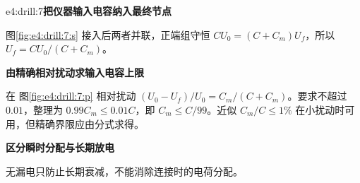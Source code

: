 \begin{drillsolution}{e4:drill:7}\textbf{把仪器输入电容纳入最终节点}\par\nobreak
图\ref{fig:e4:drill:7:s} 接入后两者并联，正端组守恒 $CU_0=(C+C_m)U_f$，所以 $U_f=CU_0/(C+C_m)$。



\par\medskip{}\noindent\textbf{由精确相对扰动求输入电容上限}\par\nobreak
在 图\ref{fig:e4:drill:7:p} 相对扰动 $(U_0-U_f)/U_0=C_m/(C+C_m)$。要求不超过 $0.01$，整理为 $0.99C_m\le0.01C$，即 $C_m\le C/99$。近似 $C_m/C\le1\%$ 在小扰动时可用，但精确界限应由分式求得。

\par\medskip{}\noindent\textbf{区分瞬时分配与长期放电}\par\nobreak
无漏电只防止长期衰减，不能消除连接时的电荷分配。\end{drillsolution}
